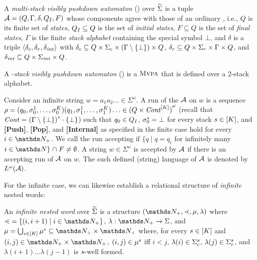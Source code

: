 \documentclass{LMCS}
\begin{document}
\begin{defi}
  A \emph{\Buchi multi-stack visibly pushdown automaton} (\Buchi \MVPA) over
  $\widetilde{\Sigma}$ is a tuple $\mathcal{A}=(Q,\Gamma,\delta,Q_I,F)$ whose components agree
  with those of an ordinary \MVPA, i.e., $Q$ is its finite set of
  \emph{states}, $Q_I \subseteq Q$ is the set of \emph{initial states}, $F
  \subseteq Q$ is the set of \emph{final states}, $\Gamma$ is the finite
  \emph{stack alphabet} containing the special symbol $\bot$, and $\delta$ is
  a triple $\langle\delta_c,\delta_r,\delta_{\mathit{int}}\rangle$ with $\delta_c \mathrel{\subseteq} Q \times \Sigma_c
  \times (\Gamma \setminus \{\bot\}) \times Q$, $\delta_r \mathrel{\subseteq} Q
  \times \Sigma_r \times \Gamma \times Q$, and $\delta_{\mathit{int}} \mathrel{\subseteq} Q
  \times \Sigma_{\mathit{int}} \times Q$.

  A \emph{-stack visibly pushdown automaton} (\Buchi \tVPA) is a
  \Buchi $\textsc{Mvpa}$ that is defined over a 2-stack alphabet.
\end{defi}

Consider an infinite string $w = a_1 a_2 \ldots \in \Sigma^\omega$. A run of
the \Buchi \MVPA $\mathcal{A}$ on $w$ is a sequence $\rho = (q_0,\sigma_0^1, \ldots,
\sigma_0^K) (q_1,\sigma_1^1, \ldots, \sigma_1^K) \ldots \in {(Q
  \times \mathit{Cont}^{[K]})}^\omega$ (recall that $\mathit{Cont}={(\Gamma \setminus
  \{\bot\})}^\ast \cdot \{\bot\}$) such that $q_0 \in Q_I$, $\sigma_0^s
= \bot$ for every stack $s \in [K]$, and {\bf [Push]}, {\bf [Pop]},
and {\bf [Internal]} as specified in the finite case hold for every $i \in
\infDom$. We call the run accepting if $\{q \mid q = q_i$ for infinitely many
$i \in \N\} \mathrel{\cap} F \neq \emptyset$. A string $w \in \Sigma^\omega$
is accepted by $\mathcal{A}$ if there is an accepting run of $\mathcal{A}$ on $w$. The such
defined (string) language of $\mathcal{A}$ is denoted by $L^\omega(\mathcal{A})$.

For the infinite case, we can likewise establish a relational structure of
\emph{infinite} nested words:

\begin{defi}
  An \emph{infinite nested word} over $\widetilde{\Sigma}$ is a structure
  $(\infDom,\succord,\mu,\lambda)$ where $\succord=\{(i,i+1) \mid i \in
  \infDom\}$, $\lambda: \infDom \rightarrow \Sigma$, and $\mu =
  \bigcup_{\stack \in [\nstack]} \mu^\stack \subseteq \infDom \times \infDom$
  where, for every $s \in [K]$ and $(i,j) \in \infDom \times
  \infDom$, $(i,j) \in \mu^s$ iff $i < j$, $\lambda(i) \in
  \Sigma_c^s$, $\lambda(j) \in \Sigma_r^s$, and $\lambda(i+1) \ldots
  \lambda(j-1)$ is $s$-well formed.
\end{defi}
\end{document}
